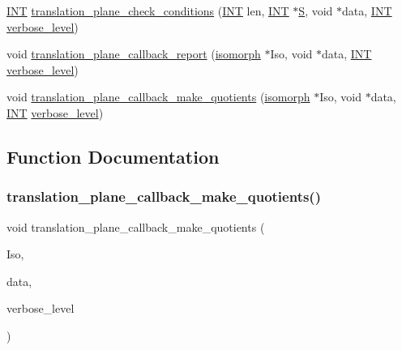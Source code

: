 \begin{DoxyCompactItemize}
\item 
\mbox{\hyperlink{galois_8h_a09fddde158a3a20bd2dcadb609de11dc}{I\+NT}} \mbox{\hyperlink{translation__plane2_8_c_aed777cfdf2ecbf77f3fd004c391bc65f}{translation\+\_\+plane\+\_\+check\+\_\+conditions}} (\mbox{\hyperlink{galois_8h_a09fddde158a3a20bd2dcadb609de11dc}{I\+NT}} len, \mbox{\hyperlink{galois_8h_a09fddde158a3a20bd2dcadb609de11dc}{I\+NT}} $\ast$\mbox{\hyperlink{simeon_8_c_adab47f8243f1b5a2c31df2535d6b37d0}{S}}, void $\ast$data, \mbox{\hyperlink{galois_8h_a09fddde158a3a20bd2dcadb609de11dc}{I\+NT}} \mbox{\hyperlink{simeon_8_c_a818073fbcc2f439e7c56952f67386122}{verbose\+\_\+level}})
\item 
void \mbox{\hyperlink{translation__plane2_8_c_aeff5feb3c1b948f39c229c9bd6afd267}{translation\+\_\+plane\+\_\+callback\+\_\+report}} (\mbox{\hyperlink{classisomorph}{isomorph}} $\ast$Iso, void $\ast$data, \mbox{\hyperlink{galois_8h_a09fddde158a3a20bd2dcadb609de11dc}{I\+NT}} \mbox{\hyperlink{simeon_8_c_a818073fbcc2f439e7c56952f67386122}{verbose\+\_\+level}})
\item 
void \mbox{\hyperlink{translation__plane2_8_c_a077995f3a0ac31008f68e08b9a735c96}{translation\+\_\+plane\+\_\+callback\+\_\+make\+\_\+quotients}} (\mbox{\hyperlink{classisomorph}{isomorph}} $\ast$Iso, void $\ast$data, \mbox{\hyperlink{galois_8h_a09fddde158a3a20bd2dcadb609de11dc}{I\+NT}} \mbox{\hyperlink{simeon_8_c_a818073fbcc2f439e7c56952f67386122}{verbose\+\_\+level}})
\end{DoxyCompactItemize}


\subsection{Function Documentation}
\mbox{\label{translation__plane2_8_c_a077995f3a0ac31008f68e08b9a735c96}} 
\subsubsection{\texorpdfstring{translation\+\_\+plane\+\_\+callback\+\_\+make\+\_\+quotients()}{translation\_plane\_callback\_make\_quotients()}}
{\footnotesize\ttfamily void translation\+\_\+plane\+\_\+callback\+\_\+make\+\_\+quotients (\begin{DoxyParamCaption}\item[{\mbox{\hyperlink{classisomorph}{isomorph}} $\ast$}]{Iso,  }\item[{void $\ast$}]{data,  }\item[{\mbox{\hyperlink{galois_8h_a09fddde158a3a20bd2dcadb609de11dc}{I\+NT}}}]{verbose\+\_\+level }\end{DoxyParamCaption})}

